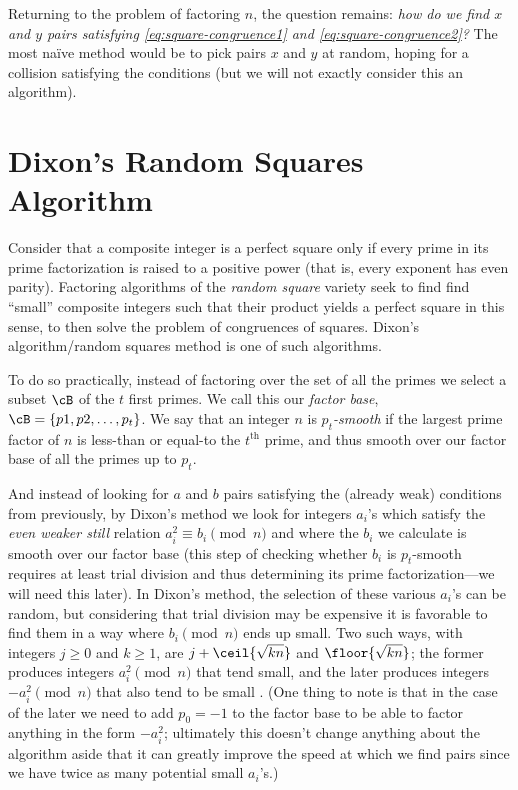 \documentclass{report}
\begin{document}
Returning to the problem of factoring $n$, the question remains:
\emph{how do we find $x$ and $y$ pairs satisfying \cref{eq:square-congruence1} and
\cref{eq:square-congruence2}?}
The most naïve method would be to pick pairs $x$ and $y$ at random, hoping for a collision
satisfying the conditions (but we will not exactly consider this an algorithm).

\section{Dixon's Random Squares Algorithm}

Consider that a composite integer is a perfect square only if every prime in its prime factorization
is raised to a positive power (that is, every exponent has even parity). Factoring algorithms of the
\emph{random square} variety seek to find find ``small'' composite integers such that their product
yields a perfect square in this sense, to then solve the problem of congruences of squares.
Dixon's algorithm/random squares method is one of such algorithms.

To do so practically, instead of factoring over the set of all the primes we select a subset $\cB$
of the $t$ first primes. We call this our \emph{factor base}, $\cB = \{p1,p2,\ldots,p_t\}$.
We say that an integer $n$ is \emph{$p_t$-smooth} if the largest prime factor of $n$ is less-than or
equal-to the $t^\text{th}$ prime, and thus smooth over our factor base of all the primes up to $p_t$.

And instead of looking for $a$ and $b$ pairs satisfying the (already weak) conditions from previously,
by Dixon's method we look for integers $a_i$'s which satisfy the \emph{even weaker still} relation
$a_i^2\equiv b_i\pmod n$ and where the $b_i$ we calculate is smooth over our factor base
(this step of checking whether $b_i$ is $p_t$-smooth requires at least trial division and thus
determining its prime factorization---we will need this later).
In Dixon's method, the selection of these various $a_i$'s can be random, but considering that trial
division may be expensive it is favorable to find them in a way where $b_i\pmod n$ ends up small.
Two such ways, with integers $j\ge 0$ and $k\ge 1$, are $j+\ceil{\sqrt{kn}}$ and
$\floor{\sqrt{kn}}$; the former produces integers $a_i^2\pmod n$ that tend small, and
the later produces integers $-a_i^2\pmod n$ that also tend to be small \cite{handbook}.
(One thing to note is that in the case of the later we need to add $p_0=-1$ to the
factor base to be able to factor anything in the form $-a_i^2$; ultimately this doesn't change
anything about the algorithm aside that it can greatly improve the speed at which we find pairs
since we have twice as many potential small $a_i$'s.)
\end{document}
